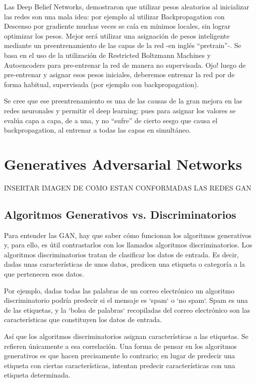 \documentclass[a4paper]{article}
\begin{document}
Las Deep Belief Networks, demostraron que utilizar pesos aleatorios al inicializar las redes son una mala idea: por ejemplo al utilizar Backpropagation con Descenso por gradiente muchas veces se caía en mínimos locales, sin lograr optimizar los pesos. Mejor será utilizar una asignación de pesos inteligente mediante un preentrenamiento de las capas de la red -en inglés “pretrain”-. Se basa en el uso de la utilización de Restricted Boltzmann Machines y Autoencoders para pre-entrenar la red de manera no supervisada. Ojo! luego de pre-entrenar y asignar esos pesos iniciales, deberemos entrenar la red por de forma habitual, supervisada (por ejemplo con backpropagation).

Se cree que ese preentrenamiento es una de las causas de la gran mejora en las redes neuronales y permitir el deep learning: pues para asignar los valores se evalúa capa a capa, de a una, y no “sufre” de cierto sesgo que causa el backpropagation, al entrenar a todas las capas en simultáneo.

\section{Generatives Adversarial Networks}
INSERTAR IMAGEN DE COMO ESTAN CONFORMADAS LAS REDES GAN

\subsection{Algoritmos Generativos vs. Discriminatorios}

Para entender las GAN, hay que saber cómo funcionan los algoritmos generativos y, para ello, es útil contrastarlos con los llamados algoritmos discriminatorios. Los algoritmos discriminatorios tratan de clasificar los datos de entrada. Es decir, dadas unas características de unos datos, predicen una etiqueta o categoría a la que pertenecen esos datos.

Por ejemplo, dadas todas las palabras de un correo electrónico un algoritmo discriminatorio podría predecir si el mensaje es `spam` o `no spam`. Spam es una de las etiquetas, y la `bolsa de palabras` recopiladas del correo electrónico son las características que constituyen los datos de entrada.

Así que los algoritmos discriminatorios asignan características a las etiquetas. Se refieren únicamente a esa correlación. Una forma de pensar en los algoritmos generativos es que hacen precisamente lo contrario; en lugar de predecir una etiqueta con ciertas características, intentan predecir características con una etiqueta determinada.
\end{document}

